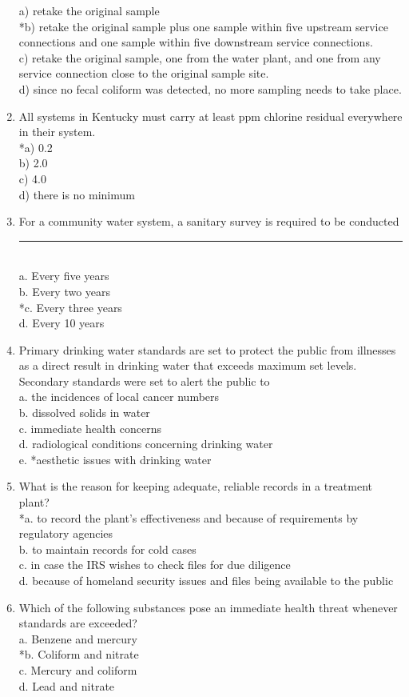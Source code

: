 \begin{enumerate}
a) retake the original sample\\
*b) retake the original sample plus one sample within five upstream service connections and one sample within five downstream service connections.\\
c) retake the original sample, one from the water plant, and one from any service connection close to the original sample site.\\
d) since no fecal coliform was detected, no more sampling needs to take place.\\
\item All systems in Kentucky must carry at least ppm chlorine residual everywhere in their system.\\
*a) 0.2\\
b) 2.0\\
c) 4.0\\
d) there is no minimum\\

\item For a community water system, a sanitary survey is required to be conducted \rule{1.5cm}{0.5pt}\\

a. Every five years\\
b. Every two years\\
*c. Every three years\\
d. Every 10 years

  \item Primary drinking water standards are set to protect the public from illnesses as a direct result in drinking water that exceeds maximum set levels. Secondary standards were set to alert the public to\\
a. the incidences of local cancer numbers\\
b. dissolved solids in water\\
c. immediate health concerns\\
d. radiological conditions concerning drinking water\\
e. *aesthetic issues with drinking water\\

  \item What is the reason for keeping adequate, reliable records in a treatment plant?\\
*a. to record the plant's effectiveness and because of requirements by regulatory agencies\\
b. to maintain records for cold cases\\
c. in case the IRS wishes to check files for due diligence\\
d. because of homeland security issues and files being available to the public\\

\item Which of the following substances pose an immediate health threat whenever standards are exceeded?\\
a.	Benzene and mercury\\
*b.	Coliform and nitrate\\
c.  Mercury and coliform\\
d.  Lead and nitrate\\
\end{enumerate}


